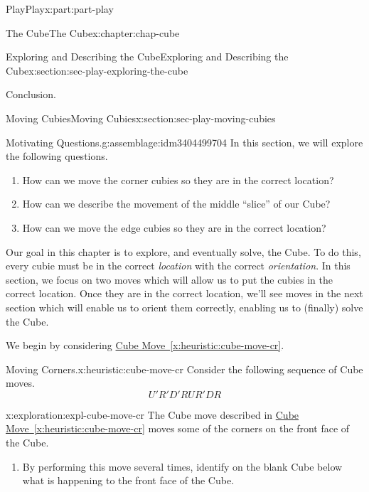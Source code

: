 \documentclass[oneside,10pt,]{book}
\newcommand{\xreffont}{\relax}
\numberwithin{equation}{section}
\begin{document}
\begin{partptx}{Play}{}{Play}{}{}{x:part:part-play}
\begin{chapterptx}{The Cube}{}{The Cube}{}{}{x:chapter:chap-cube}
\begin{sectionptx}{Exploring and Describing the Cube}{}{Exploring and Describing the Cube}{}{}{x:section:sec-play-exploring-the-cube}
\begin{conclusion}{Conclusion.}
\end{conclusion}%
\end{sectionptx}
%
%
\typeout{************************************************}
\typeout{************************************************}
%
\begin{sectionptx}{Moving Cubies}{}{Moving Cubies}{}{}{x:section:sec-play-moving-cubies}
\begin{assemblage}{Motivating Questions.}{g:assemblage:idm3404499704}%
In this section, we will explore the following questions. %
\begin{enumerate}
\item{}How can we move the corner cubies so they are in the correct location?%
\item{}How can we describe the movement of the middle ``slice'' of our Cube?%
\item{}How can we move the edge cubies so they are in the correct location?%
\end{enumerate}
%
\end{assemblage}
\begin{introduction}{}%
Our goal in this chapter is to explore, and eventually solve, the Cube. To do this, every cubie must be in the correct \emph{location} with the correct \emph{orientation}. In this section, we focus on two moves which will allow us to put the cubies in the correct location. Once they are in the correct location, we'll see moves in the next section which will enable us to orient them correctly, enabling us to (finally) solve the Cube.%
\end{introduction}%
We begin by considering \hyperref[x:heuristic:cube-move-cr]{Cube Move~{\xreffont\ref{x:heuristic:cube-move-cr}}}.%
\begin{heuristic}{Moving Corners.}{}{x:heuristic:cube-move-cr}%
Consider the following sequence of Cube moves.%
%
\begin{equation*}
U' R' D' R U R' D R
\end{equation*}
\end{heuristic}
\begin{exploration}{}{x:exploration:expl-cube-move-cr}%
The Cube move described in \hyperref[x:heuristic:cube-move-cr]{Cube Move~{\xreffont\ref{x:heuristic:cube-move-cr}}} moves some of the corners on the front face of the Cube.%
%
\begin{enumerate}
\item{}By performing this move several times, identify on the blank Cube below what is happening to the front face of the Cube.%

\end{enumerate}
\end{exploration}
\end{sectionptx}
\end{chapterptx}
\end{partptx}
\end{document}
